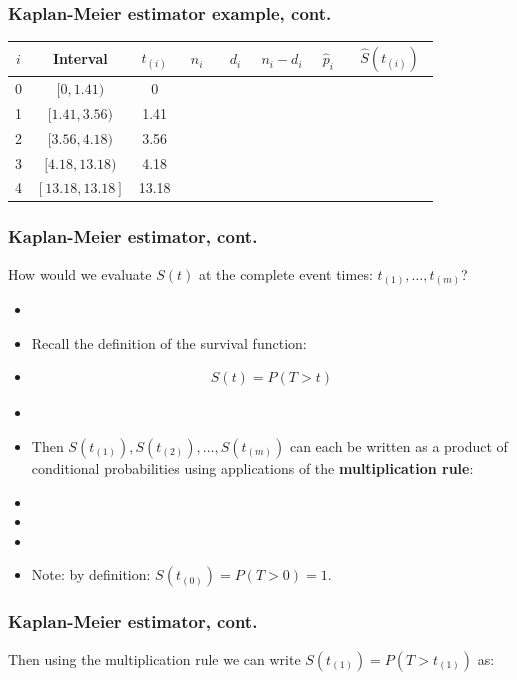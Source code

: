 \begin{frame}
\frametitle{Kaplan-Meier estimator example, cont.}
\hspace*{-0.3in}
{\renewcommand{\arraystretch}{2.0}
\begin{tabular}{|c|c|c|c|c|c|c|c|}
\hline
$i$ & Interval & $t_{(i)}$ & $~~n_i~~$ & $~~d_i~~$ & $n_i-d_i$ &$~~\hat{p}_i~~$ & $~~\widehat{S}(t_{(i)})~~$ \\
\hline
0 & $[0,1.41)$ & 0 &  &  & & &\\
\hline
1 & $[1.41,3.56)$ & 1.41 & &  &  & &  \\
\hline
2& $[3.56,4.18)$ & 3.56 & & &  &  & \\
\hline
3 & $[4.18,13.18)$ & 4.18 & & & & &\\
\hline
4 & $[13.18,13.18]$ & 13.18 & & & & &\\
 \hline
\end{tabular}}
\end{frame}



\begin{frame}
\frametitle{Kaplan-Meier estimator, cont.}
How would we evaluate $S(t)$ at the complete event times: $t_{(1)}, \ldots, t_{(m)}$?
\begin{itemize}
\item[]
\item Recall the definition of the survival function:
\item[]
\begin{eqnarray}
{S(t)=P(T>t)} \nonumber
\end{eqnarray}
\item[]
\item Then $S(t_{(1)}), S(t_{(2)}), \ldots, S(t_{(m)})$ can each be written as a product of conditional probabilities
 using applications of the \textbf{multiplication rule}:
 \item[]
 \item[]
 \item[]

\item Note: by definition: $S(t_{(0)})=P(T>0)=1$.
\end{itemize}
\end{frame}


\begin{frame}
\frametitle{Kaplan-Meier estimator, cont.}
Then using the multiplication rule we can write
$S(t_{(1)})=P(T>t_{(1)})$ as:
\vskip200pt
\end{frame}


